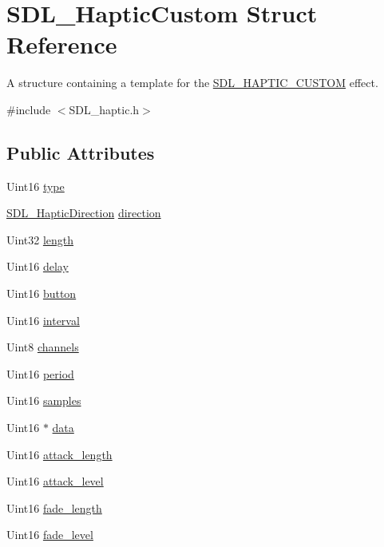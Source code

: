 \hypertarget{struct_s_d_l___haptic_custom}{}\section{S\+D\+L\+\_\+\+Haptic\+Custom Struct Reference}
\label{struct_s_d_l___haptic_custom}


A structure containing a template for the \mbox{\hyperlink{_s_d_l__haptic_8h_a8a18c4de1076ac9bebd718329d16db29}{S\+D\+L\+\_\+\+H\+A\+P\+T\+I\+C\+\_\+\+C\+U\+S\+T\+OM}} effect.  




{\ttfamily \#include $<$S\+D\+L\+\_\+haptic.\+h$>$}

\subsection*{Public Attributes}
\begin{DoxyCompactItemize}
\item 
Uint16 \mbox{\hyperlink{struct_s_d_l___haptic_custom_a98a8995c94492069dc007502ed97eed2}{type}}
\item 
\mbox{\hyperlink{struct_s_d_l___haptic_direction}{S\+D\+L\+\_\+\+Haptic\+Direction}} \mbox{\hyperlink{struct_s_d_l___haptic_custom_ad7eb84f59404d9e0da07570b4b57dd43}{direction}}
\item 
Uint32 \mbox{\hyperlink{struct_s_d_l___haptic_custom_ad70e8bc2cff74b99d704a757c16b363f}{length}}
\item 
Uint16 \mbox{\hyperlink{struct_s_d_l___haptic_custom_a094229466ff4cf695860db664100a2b0}{delay}}
\item 
Uint16 \mbox{\hyperlink{struct_s_d_l___haptic_custom_aa4fbaf7220f3197aa6631b3e64ad6562}{button}}
\item 
Uint16 \mbox{\hyperlink{struct_s_d_l___haptic_custom_afdeb26b1709254545e00a59a0a6c360c}{interval}}
\item 
Uint8 \mbox{\hyperlink{struct_s_d_l___haptic_custom_a560215762e9096d583d75867d9227cf5}{channels}}
\item 
Uint16 \mbox{\hyperlink{struct_s_d_l___haptic_custom_aba7fafa808e90baddef25f009b8f4817}{period}}
\item 
Uint16 \mbox{\hyperlink{struct_s_d_l___haptic_custom_a5905ea1b6182da846535ca8c80b4fa33}{samples}}
\item 
Uint16 $\ast$ \mbox{\hyperlink{struct_s_d_l___haptic_custom_ad5a034f97e1699eacbe3f478538537c5}{data}}
\item 
Uint16 \mbox{\hyperlink{struct_s_d_l___haptic_custom_a018b35d89398c26e10d1fb4315d1dda1}{attack\+\_\+length}}
\item 
Uint16 \mbox{\hyperlink{struct_s_d_l___haptic_custom_ad6e394e3775372af3eb9e02823987405}{attack\+\_\+level}}
\item 
Uint16 \mbox{\hyperlink{struct_s_d_l___haptic_custom_ab47fac94baeba28a3acd6c706e0b6a5c}{fade\+\_\+length}}
\item 
Uint16 \mbox{\hyperlink{struct_s_d_l___haptic_custom_a73a522581eb514d032e500ec6294fe50}{fade\+\_\+level}}
\end{DoxyCompactItemize}



